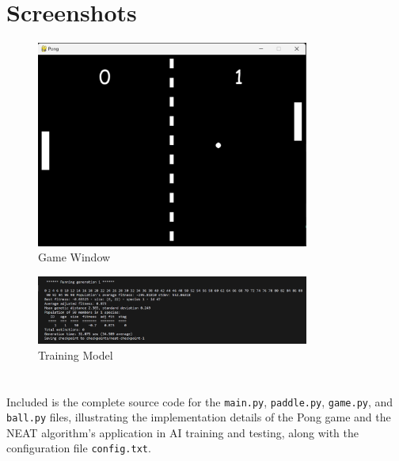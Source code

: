 \documentclass[10pt]{article}
\begin{document}
\section{Screenshots}
\begin{figure}[h]
    \centering
    \includegraphics[width=0.8\textwidth]{Game.png} 
    \caption{Game Window}
    \label{fig:example}
\end{figure}
\begin{figure}[h]
    \centering
    \includegraphics[width=0.8\textwidth, height=0.22\textheight]{Training.png} 
    \caption{Training Model}
    \label{fig:example}
\end{figure}

\newpage

\section*{}
Included is the complete source code for the \texttt{main.py}, \texttt{paddle.py}, \texttt{game.py}, and \texttt{ball.py} files, illustrating the implementation details of the Pong game and the NEAT algorithm's application in AI training and testing, along with the configuration file \texttt{config.txt}.
\end{document}
